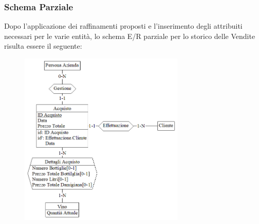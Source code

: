 \documentclass{article}
\begin{document}
\subsubsection{Schema Parziale}
Dopo l'applicazione dei raffinamenti proposti e l'inserimento degli attribuiti necessari per le varie entità, lo schema E/R parziale per lo storico delle Vendite risulta essere il seguente:
\begin{figure}[htbp]
\centering
\includegraphics[width=0.7\textwidth]{img/Vendite_Parziale}
\end{figure}
\newpage
\end{document}
